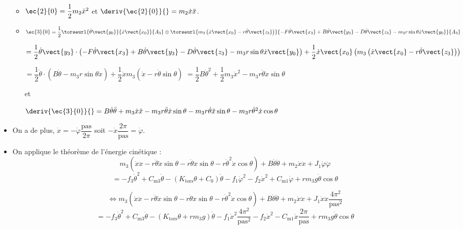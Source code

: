\begin{corrige}
\begin{itemize}
\begin{itemize}
\item $\ec{2}{0}= \dfrac{1}{2}m_2 \dot{x}^2$ et $\deriv{\ec{2}{0}}{} = m_2 \dot{x}\ddot{x}$.

\item $\ec{3}{0} = \dfrac{1}{2} \torseurl{\dot{\theta} \vect{y_0}}{ \dot{x}\vect{x_0} }{A_3} \otimes \torseurl{m_3\left(\dot{x}\vect{x_0} -r  \dot{\theta}\vect{z_3}\right)}{-F\dot{\theta} \vect{x_3} + B\dot{\theta} \vect{y_3}  -D\dot{\theta}  \vect{z_3}  -  m_3 r\sin\theta \dot{x}\vect{y_0}}{A_3}$ 

$=\dfrac{1}{2} \dot{\theta} \vect{y_3} \cdot\left(-F\dot{\theta} \vect{x_3} + B\dot{\theta} \vect{y_3}  -D\dot{\theta}  \vect{z_3}  -  m_3 r\sin\theta \dot{x}\vect{y_0} \right) + \dfrac{1}{2} \dot{x}\vect{x_0} \left(m_3\left(\dot{x}\vect{x_0} -r  \dot{\theta}\vect{z_3}\right)\right)  $

$=\dfrac{1}{2} \dot{\theta}  \cdot\left( B\dot{\theta}   -  m_3 r\sin\theta \dot{x} \right) + \dfrac{1}{2} \dot{x}m_3\left(\dot{x} -r  \dot{\theta}\sin\theta\right)  $
$=\dfrac{1}{2}  B\dot{\theta}^2   + \dfrac{1}{2} m_3\dot{x}^2 - m_3 r\dot{\theta}\dot{x} \sin\theta$

et

 $\deriv{\ec{3}{0}}{} =  B\dot{\theta}\ddot{\theta}   + m_3\dot{x}\ddot{x}- m_3 r\ddot{\theta}\dot{x} \sin\theta- m_3 r\dot{\theta}\ddot{x} \sin\theta- m_3 r\dot{\theta}^2\dot{x} \cos\theta$
\end{itemize}
\item On a de plus, $\dot{x}=-\dot{\varphi}\dfrac{\text{pas}}{2\pi}$ soit $-\dot{x}\dfrac{2\pi}{\text{pas}}=\dot{\varphi}$. 

\item On applique le théorème de l'énergie cinétique : 
$$
m_3\left(\dot{x}\ddot{x}  - r\ddot{\theta}\dot{x}  \sin \theta- r\dot{\theta}\ddot{x}  \sin \theta- r\dot{\theta}^2\dot{x}  \cos \theta \right)+ B\dot{\theta}\ddot{\theta}
+ m_2 \dot{x}\ddot{x}
+ J_1 \dot{\varphi}\ddot{\varphi}
$$
$$=
 -f_3 \dot{\theta}^2
 +C_{\text{m3}}\dot{\theta}
 -\left(K_{\text{tors}}\theta + C_0\right) \dot{\theta}
  -f_1 \dot{\varphi}^2  
  - f_2 \dot{x}^2 +C_{\text{m1}} \dot{\varphi} 
  +rm_3 g   \dot{\theta} \cos \theta
$$

$$
\Leftrightarrow m_3\left(\dot{x}\ddot{x}  - r\ddot{\theta}\dot{x}  \sin \theta- r\dot{\theta}\ddot{x}  \sin \theta- r\dot{\theta}^2\dot{x}  \cos \theta \right)+ B\dot{\theta}\ddot{\theta}
+ m_2 \dot{x}\ddot{x}
+ J_1 \dot{x}\ddot{x}\dfrac{4\pi^2}{\text{pas}^2} 
$$
$$=
 -f_3 \dot{\theta}^2
 +C_{\text{m3}}\dot{\theta}
 -\left(K_{\text{tors}}\theta +rm_3 g\right) \dot{\theta}
  -f_1 \dot{x}^2\dfrac{4\pi^2}{\text{pas}^2} 
  - f_2 \dot{x}^2 -C_{\text{m1}} \dot{x}\dfrac{2\pi}{\text{pas}}
  +rm_3 g   \dot{\theta} \cos \theta
$$


\end{itemize}
\end{corrige}
